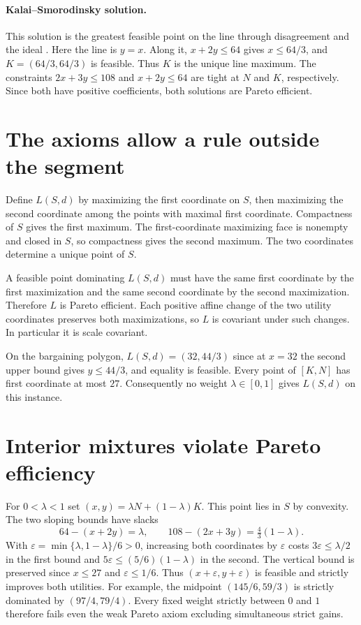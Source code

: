 \documentclass[11pt]{article}
\begin{document}
\paragraph{Kalai--Smorodinsky solution.}
This solution is the greatest feasible point on the line through
disagreement and the ideal \cite[p.~516]{ks}. Here the line is $y=x$.
Along it, $x+2y\le64$ gives $x\le64/3$, and
$K=(64/3,64/3)$ is feasible. Thus $K$ is the unique line maximum.
The constraints $2x+3y\le108$ and $x+2y\le64$ are tight at $N$ and $K$,
respectively. Since both have positive coefficients, both solutions
are Pareto efficient.

\newpage

\section{The axioms allow a rule outside the segment}

Define $L(S,d)$ by maximizing the first coordinate on $S$, then maximizing
the second coordinate among the points with maximal first coordinate.
Compactness of $S$ gives the first maximum. The first-coordinate maximizing
face is nonempty and closed in $S$, so compactness gives the second maximum.
The two coordinates determine a unique point of $S$.

A feasible point dominating $L(S,d)$ must have the same first coordinate
by the first maximization and the same second coordinate by the second
maximization. Therefore $L$ is Pareto efficient. Each positive affine
change of the two utility coordinates preserves both maximizations, so
$L$ is covariant under such changes. In particular it is scale covariant.

On the bargaining polygon, $L(S,d)=(32,44/3)$ since at $x=32$ the second
upper bound gives $y\le44/3$, and equality is feasible. Every point of
$[K,N]$ has first coordinate at most $27$. Consequently no weight
$\lambda\in[0,1]$ gives $L(S,d)$ on this instance.

\section{Interior mixtures violate Pareto efficiency}

For $0<\lambda<1$ set $(x,y)=\lambda N+(1-\lambda)K$.
This point lies in $S$ by convexity. The two sloping bounds have slacks
\[
  64-(x+2y)=\lambda,\qquad
  108-(2x+3y)=\tfrac43(1-\lambda).
\]
With $\varepsilon=\min\{\lambda,1-\lambda\}/6>0$, increasing both
coordinates by $\varepsilon$ costs $3\varepsilon\le\lambda/2$ in the first
bound and $5\varepsilon\le(5/6)(1-\lambda)$ in the second. The vertical
bound is preserved since $x\le27$ and $\varepsilon\le1/6$. Thus
$(x+\varepsilon,y+\varepsilon)$ is feasible and strictly improves both
utilities. For example, the midpoint $(145/6,59/3)$ is strictly dominated
by $(97/4,79/4)$. Every fixed weight strictly between $0$ and $1$ therefore
fails even the weak Pareto axiom excluding simultaneous strict gains.
\end{document}
